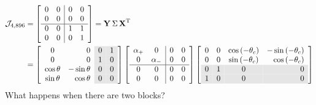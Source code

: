 \begin{equation}
  \begin{split}
    \mathcal{J}_{4,896} &= 
\mat{cc|cc}
{
                0 & 0 & 0 & 0 \\
                0 & 0 & 0 & 0 \\\hline
                0 & 0 & 1 & 1 \\
                0 & 0 & 0 & 1
}   = \svd{T}\\
   &=
\mat{cr>{\columncolor{ltgray}}r>{\columncolor{ltgray}}r}
{
                 0 & 0 & 0 & 1 \\
                 0 & 0 & 1 & 0 \\
                \cos\theta & -\sin\theta & 0 & 0 \\
                \sin\theta &  \cos\theta & 0 & 0
}
\mat{cc|cc}
{                
            \alpha_{+} & 0 & 0 & 0 \\
            0 & \alpha_{-} & 0 & 0 \\\hline
            0 & 0 & 0 & 0\\
            0 & 0 & 0 & 0
}%
\mat{cccr}
{                
                0 & 0 & \cos\paren{-\theta_{c}} & -\sin\paren{-\theta_{c}} \\
                0 & 0 & \sin\paren{-\theta_{c}} &  \cos\paren{-\theta_{c}} \\
\rowcolor{ltgray}
                0 & 1 & 0 & 0 \\
\rowcolor{ltgray}
                1 & 0 & 0 & 0 \\
}
  \end{split}
\end{equation}
What happens when there are two blocks?
